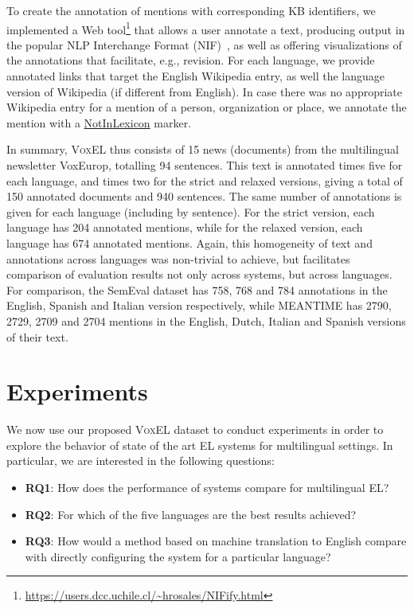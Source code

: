 \documentclass{llncs}
\begin{document}
To create the annotation of mentions with corresponding KB identifiers, we implemented a Web tool\footnote{\url{https://users.dcc.uchile.cl/~hrosales/NIFify.html}} that allows a user annotate a text, producing output in the popular NLP Interchange Format (NIF)~\cite{nif2013}, as well as offering visualizations of the annotations that facilitate, e.g., revision. For each language, we provide annotated links that target the English Wikipedia entry, as well the language version of Wikipedia (if different from English). In case there was no appropriate Wikipedia entry for a mention of a person, organization or place, we annotate the mention with a \url{NotInLexicon} marker.

In summary, \textsc{VoxEL} thus consists of 15 news (documents) from the multilingual newsletter VoxEurop, totalling 94 sentences. This text is annotated times five for each language, and times two for the strict and relaxed versions, giving a total of 150 annotated documents and 940 sentences. The same number of annotations is given for each language (including by sentence). For the strict version, each language has 204 annotated mentions, while for the relaxed version, each language has 674 annotated mentions. Again, this homogeneity of text and annotations across languages was non-trivial to achieve, but facilitates comparison of evaluation results not only across systems, but across languages. For comparison, the SemEval dataset has 758, 768 and 784 annotations in the English, Spanish and Italian version respectively, while MEANTIME has 2790, 2729, 2709 and 2704 mentions in the English, Dutch, Italian and Spanish versions of their text.

\section{Experiments}\label{sec:exp}

We now use our proposed \textsc{VoxEL} dataset to conduct experiments in order to explore the behavior of state of the art EL systems for multilingual settings. In particular, we are interested in the following questions:

\begin{itemize}
\item \textbf{RQ1}: How does the performance of systems compare for multilingual EL?
\item \textbf{RQ2}: For which of the five languages are the best results achieved?
\item \textbf{RQ3}: How would a method based on machine translation to English compare with directly configuring the system for a particular language?
\end{itemize}
\end{document}
